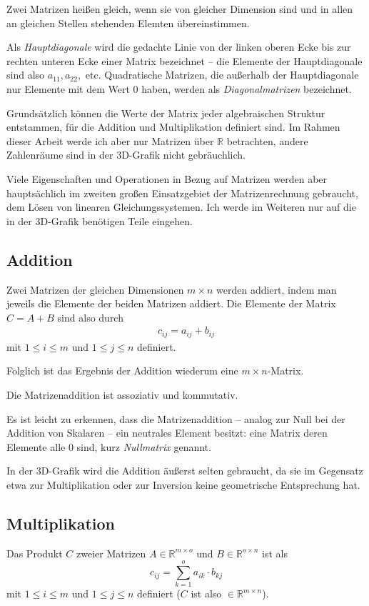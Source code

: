 Zwei Matrizen heißen gleich, wenn sie von gleicher Dimension sind und in allen an gleichen Stellen stehenden Elemten übereinstimmen. 

Als \emph{Hauptdiagonale} wird die gedachte Linie von der linken oberen Ecke bis zur rechten unteren Ecke einer Matrix bezeichnet -- die Elemente der Hauptdiagonale sind also $a_{11}, a_{22},$ etc. Quadratische Matrizen, die außerhalb der Hauptdiagonale nur Elemente mit dem Wert $0$ haben, werden als \emph{Diagonalmatrizen} bezeichnet.

Grundsätzlich können die Werte der Matrix jeder algebraischen Struktur entstammen, für die Addition und Multiplikation definiert sind. Im Rahmen dieser Arbeit werde ich aber nur Matrizen über $\mathbb R$ betrachten, andere Zahlenräume sind in der 3D-Grafik nicht gebräuchlich.

Viele Eigenschaften und Operationen in Bezug auf Matrizen werden aber hauptsächlich im zweiten großen Einsatzgebiet der Matrizenrechnung gebraucht, dem Lösen von linearen Gleichungssystemen. Ich werde im Weiteren nur auf die in der 3D-Grafik benötigen Teile eingehen.

\subsection{Addition}
Zwei Matrizen der gleichen Dimensionen $m \times n$ werden addiert, indem man jeweils die Elemente der beiden Matrizen addiert. Die Elemente der Matrix $C = A + B$ sind also durch
\begin{align}
 c_{ij} = a_{ij} + b_{ij}
\end{align}
mit $1 \leq i \leq m$ und $1 \leq j \leq n$ definiert.

Folglich ist das Ergebnis der Addition wiederum eine $m \times n$-Matrix.

Die Matrizenaddition ist assoziativ und kommutativ. 

Es ist leicht zu erkennen, dass die Matrizenaddition -- analog zur Null bei der Addition von Skalaren -- ein neutrales Element besitzt: eine Matrix deren Elemente alle $0$ sind, kurz \emph{Nullmatrix} genannt.

In der 3D-Grafik wird die Addition äußerst selten gebraucht, da sie im Gegensatz etwa zur Multiplikation oder zur Inversion keine geometrische Entsprechung hat.

\subsection{Multiplikation}
Das Produkt $C$ zweier Matrizen $A \in \mathbb{R}^{m \times o}$ und $B \in \mathbb{R}^{o \times n}$ ist als
\begin{equation}
 c_{ij} = \sum_{k=1}^o{a_{ik} \cdot b_{kj}}
\end{equation}
mit $1 \leq i \leq m$ und $1 \leq j \leq n$ definiert ($C$ ist also $\in \mathbb{R}^{m \times n}$).

